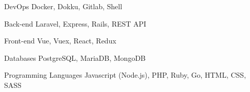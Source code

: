 

\begin{cvskills}

  \cvskill
    {DevOps} %
    {Docker, Dokku, Gitlab, Shell} %

  \cvskill
    {Back-end} %
    {Laravel, Express, Rails, REST API} %

  \cvskill
    {Front-end} %
    {Vue, Vuex, React, Redux} %

  \cvskill
    {Databases} %
    {PostgreSQL, MariaDB, MongoDB} %

  \cvskill
    {Programming Languages} %
    {Javascript (Node.js), PHP, Ruby, Go, HTML, CSS, SASS} %

\end{cvskills}
